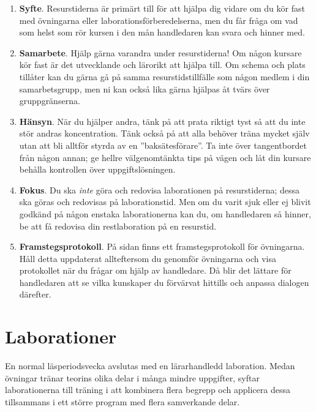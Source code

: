 \begin{enumerate}
\item \textbf{Syfte}. Resurstiderna är primärt till för att hjälpa dig vidare om du kör fast med övningarna eller laborationsförberedelserna, men du får fråga om vad som helst som rör kursen i den mån handledaren kan svara och hinner med.

\item \textbf{Samarbete}. Hjälp gärna varandra under resurstiderna! Om någon kursare kör fast är det utvecklande och lärorikt att hjälpa till. Om schema och plats tillåter kan du gärna gå på samma resurstidstillfälle som någon medlem i din samarbetsgrupp, men ni kan också lika gärna hjälpas åt tvärs över gruppgränserna.

\item \textbf{Hänsyn}. När du hjälper andra, tänk på att prata riktigt tyst så att du inte stör andras koncentration. Tänk också på att alla behöver träna mycket själv utan att bli alltför styrda av en ''baksätesförare''. Ta inte över tangentbordet från någon annan; ge hellre välgenomtänkta tips på vägen och låt din kursare behålla kontrollen över uppgiftslösningen.


\item \textbf{Fokus}. Du ska \emph{inte} göra och redovisa laborationen på resurstiderna; dessa ska göras och redovisas på laborationstid. Men om du varit sjuk eller ej blivit godkänd på någon enstaka laborationerna kan du, om handledaren så hinner, be att få redovisa din restlaboration på en resurstid.

\item \textbf{Framstegsprotokoll}. På sidan \pageref{progress-protocoll} finns ett framstegsprotokoll för övningarna. Håll detta uppdaterat allteftersom du genomför övningarna och visa protokollet när du frågar om hjälp av handledare. Då blir det lättare för handledaren att se vilka kunskaper du förvärvat hittills och anpassa dialogen därefter.


\end{enumerate}
\section{Laborationer}\label{section:labs}

En normal läsperiodsvecka avslutas med en lärarhandledd laboration. Medan övningar tränar teorins olika delar i många mindre uppgifter, syftar laborationerna till träning i att kombinera flera begrepp och applicera dessa tillsammans i ett större program med flera samverkande delar.


